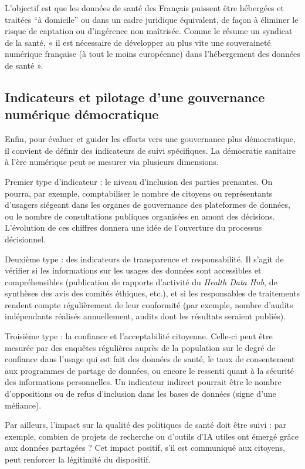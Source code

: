 \documentclass[10pt,a4paper]{article} %
\begin{document}
L’objectif est que les données de santé des Français puissent être hébergées et traitées “à domicile” ou dans un cadre juridique équivalent, de façon à éliminer le risque de captation ou d’ingérence non maîtrisée. Comme le résume un syndicat de la santé, « il est nécessaire de développer au plus vite une souveraineté numérique française (à tout le moins européenne) dans l’hébergement des données de santé ».

\subsection{Indicateurs et pilotage d’une gouvernance numérique démocratique}

Enfin, pour évaluer et guider les efforts vers une gouvernance plus démocratique, il convient de définir des indicateurs de suivi spécifiques. La démocratie sanitaire à l’ère numérique peut se mesurer via plusieurs dimensions.

Premier type d’indicateur : le niveau d’inclusion des parties prenantes. On pourra, par exemple, comptabiliser le nombre de citoyens ou représentants d’usagers siégeant dans les organes de gouvernance des plateformes de données, ou le nombre de consultations publiques organisées en amont des décisions. L’évolution de ces chiffres donnera une idée de l’ouverture du processus décisionnel.

Deuxième type : des indicateurs de transparence et responsabilité. Il s’agit de vérifier si les informations sur les usages des données sont accessibles et compréhensibles (publication de rapports d’activité du \textit{Health Data Hub}, de synthèses des avis des comités éthiques, etc.), et si les responsables de traitements rendent compte régulièrement de leur conformité (par exemple, nombre d’audits indépendants réalisés annuellement, audits dont les résultats seraient publiés).

Troisième type : la confiance et l’acceptabilité citoyenne. Celle-ci peut être mesurée par des enquêtes régulières auprès de la population sur le degré de confiance dans l’usage qui est fait des données de santé, le taux de consentement aux programmes de partage de données, ou encore le ressenti quant à la sécurité des informations personnelles. Un indicateur indirect pourrait être le nombre d’oppositions ou de refus d’inclusion dans les bases de données (signe d’une méfiance).

Par ailleurs, l’impact sur la qualité des politiques de santé doit être suivi : par exemple, combien de projets de recherche ou d’outils d’IA utiles ont émergé grâce aux données partagées ? Cet impact positif, s’il est communiqué aux citoyens, peut renforcer la légitimité du dispositif.
\end{document}
